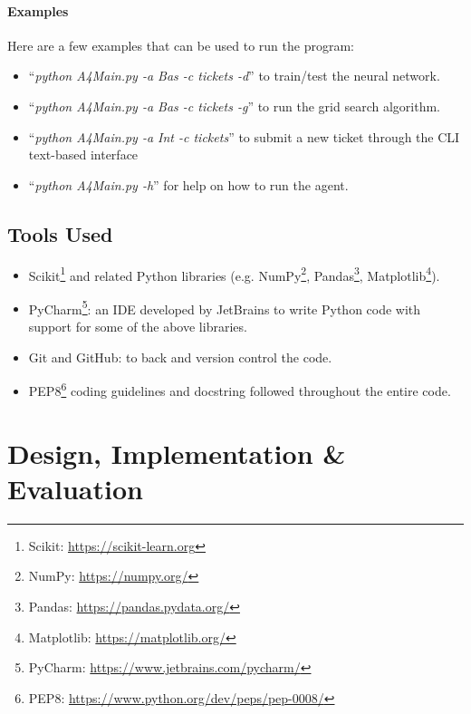 \documentclass[letterpaper,12pt]{article}
\begin{document}
\paragraph{Examples}

Here are a few examples that can be used to run the program:

\begin{itemize}
    \item ``\textit{python A4Main.py -a Bas -c tickets -d}'' to train/test the neural network.
    \item ``\textit{python A4Main.py -a Bas -c tickets -g}'' to run the grid search algorithm.
    \item ``\textit{python A4Main.py -a Int -c tickets}'' to submit a new ticket through the CLI text-based interface
    \item ``\textit{python A4Main.py -h}'' for help on how to run the agent.
\end{itemize}

\subsection{Tools Used}

\begin{itemize}
    \item Scikit\footnote{Scikit: \url{https://scikit-learn.org}} and related Python libraries (e.g. NumPy\footnote{NumPy: \url{https://numpy.org/}}, Pandas\footnote{Pandas: \url{https://pandas.pydata.org/}}, Matplotlib\footnote{Matplotlib: \url{https://matplotlib.org/}}).
    \item PyCharm\footnote{PyCharm: \url{https://www.jetbrains.com/pycharm/}}: an IDE developed by JetBrains to write Python code with support for some of the above libraries.
    \item Git and GitHub: to back and version control the code.
    \item PEP8\footnote{PEP8: \url{https://www.python.org/dev/peps/pep-0008/}} coding guidelines and docstring followed throughout the entire code.
\end{itemize}


\clearpage
\section{Design, Implementation \& Evaluation}
\label{sec:design-implementation-evaluation}
\end{document}

